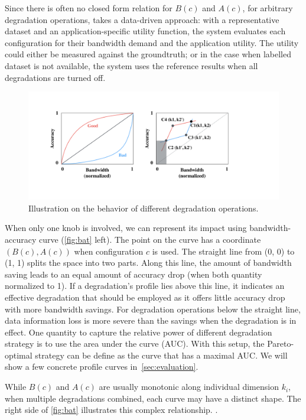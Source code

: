 Since there is often no closed form relation for $B(c)$ and $A(c)$, for
arbitrary degradation operations, \sysname{} takes a data-driven approach: with
a representative dataset and an application-specific utility function, the
system evaluates each configuration for their bandwidth demand and the
application utility. The utility could either be measured against the
groundtruth; or in the case when labelled dataset is not available, the system
uses the reference results when all degradations are turned off.

\begin{figure}
  \centering
  \includegraphics[width=\columnwidth]{figures/degrade.pdf}
  \caption{Illustration on the behavior of different degradation operations.}
  \label{fig:bat}
\end{figure}

When only one knob is involved, we can represent its impact using
bandwidth-accuracy curve (\autoref{fig:bat} left). The point on the curve has a
coordinate $(B(c), A(c))$ when configuration $c$ is used. The straight line from
(0, 0) to (1, 1) splits the space into two parts. Along this line, the amount of
bandwidth saving leads to an equal amount of accuracy drop (when both quantity
normalized to 1). If a degradation's profile lies above this line, it indicates
an effective degradation that should be employed as it offers little accuracy
drop with more bandwidth savings. For degradation operations below the straight
line, data information loss is more severe than the savings when the degradation
is in effect. One quantity to capture the relative power of different
degradation strategy is to use the area under the curve (AUC). With this setup,
the Pareto-optimal strategy can be define as the curve that has a maximal AUC.
We will show a few concrete profile curves in~\autoref{sec:evaluation}.

While $B(c)$ and $A(c)$ are usually monotonic along individual dimension $k_i$,
when multiple degradations combined, each curve may have a distinct shape. The
right side of \autoref{fig:bat} illustrates this complex
relationship. .

